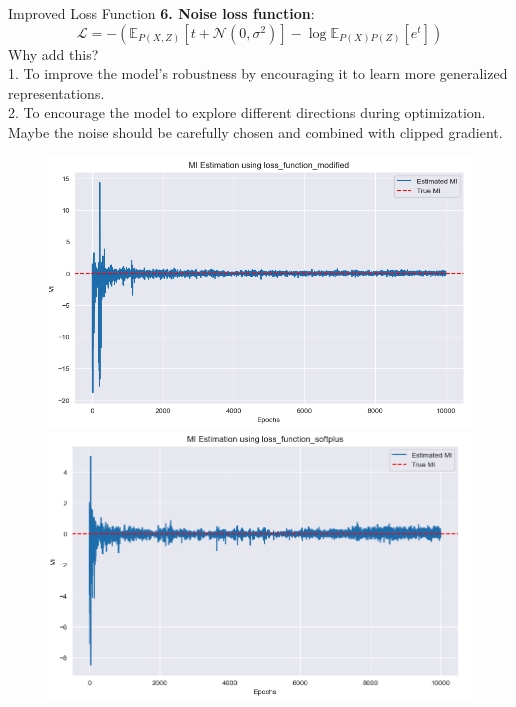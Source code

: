\documentclass[final]{beamer}
\newlength{\colwidth}
\begin{document}
\begin{frame}[t]
\begin{columns}[t]
\begin{column}{\colwidth}
\begin{block}{Improved Loss Function}
  \textbf{6. Noise loss function}:
  $$\mathcal {L} = - \left( \mathbb{E}_{P(X, Z)}[t + \mathcal{N}(0, \sigma^2)] - \log \mathbb{E}_{P(X)P(Z)}[e^t] \right)$$
  Why add this?\\
  1. To improve the model’s robustness by encouraging it to learn more generalized representations.\\
  2. To encourage the model to explore different directions during optimization.\\
  Maybe the noise should be carefully chosen and combined with clipped gradient.

  \begin{figure}
    \centering
    \begin{minipage}{0.49\textwidth}
    \centering
    \includegraphics[width=1\linewidth]{MI_img/截屏2024-12-31 13.19.12.png}
    \end{minipage}
    \begin{minipage}{0.49\textwidth}
    \centering
    \centering
    \includegraphics[width=1\linewidth]{MI_img/截屏2024-12-31 13.19.36.png}
    \end{minipage}
    \end{figure}


\end{block}
\end{column}
\end{columns}
\end{frame}
\end{document}
